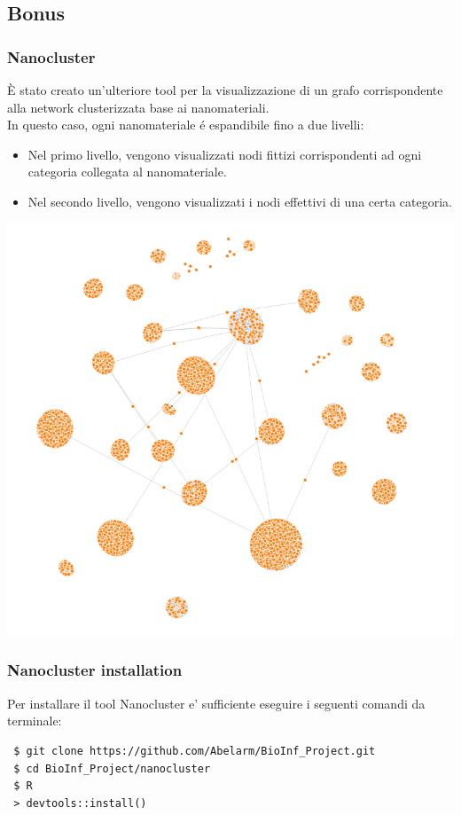 \documentclass{beamer}
\begin{document}
\subsection{Bonus}
\begin{frame}
\frametitle{Nanocluster}
È stato creato un'ulteriore tool per la visualizzazione di un grafo corrispondente alla network clusterizzata base ai nanomateriali.\\
\medskip
In questo caso, ogni nanomateriale \'e espandibile fino a due livelli:
\begin{itemize}
	\item Nel primo livello, vengono visualizzati nodi fittizi corrispondenti ad ogni categoria collegata al nanomateriale. 
	\item Nel secondo livello, vengono visualizzati i nodi effettivi di una certa categoria.
\end{itemize}
\end{frame}

\begin{frame}
\begin{center}
\includegraphics[scale=0.3]{img/nano_cluster_network.png} 
\end{center}
\end{frame}

\begin{frame}[fragile]
\frametitle{Nanocluster installation}
Per installare il tool Nanocluster e' sufficiente eseguire i seguenti comandi da terminale:
\begin{footnotesize}
\begin{lstlisting}
 $ git clone https://github.com/Abelarm/BioInf_Project.git
 $ cd BioInf_Project/nanocluster
 $ R
 > devtools::install()
\end{lstlisting}
\end{footnotesize}
\end{frame}
\end{document}
